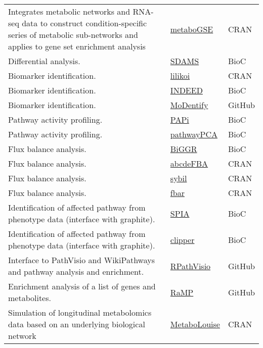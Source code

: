\documentclass[]{article}
\begin{document}
\begin{longtable}{>{\raggedright\arraybackslash}p{30em}>{\raggedright\arraybackslash}p{10em}>{\raggedright\arraybackslash}p{3em}}
\rowcolor{gray!6}  Integrates metabolic networks and RNA-seq data to construct condition-specific series of metabolic sub-networks and applies to gene set enrichment analysis & \href{https://cran.r-project.org/package=metaboGSE}{metaboGSE} & CRAN\\
Differential analysis. & \href{https://bioconductor.org/packages/release/bioc/html/SDAMS.html}{SDAMS} & BioC\\
\rowcolor{gray!6}  Biomarker identification. & \href{https://cran.r-project.org/package=lilikoi}{lilikoi} & CRAN\\
Biomarker identification. & \href{https://bioconductor.org/packages/release/bioc/html/INDEED.html}{INDEED} & BioC\\
\rowcolor{gray!6}  Biomarker identification. & \href{https://github.com/krumsieklab/MoDentify}{MoDentify} & GitHub\\
Pathway activity profiling. & \href{NA}{PAPi} & BioC\\
\rowcolor{gray!6}  Pathway activity profiling. & \href{https://www.bioconductor.org/packages/devel/bioc/html/pathwayPCA.html}{pathwayPCA} & BioC\\
Flux balance analysis. & \href{https://bioconductor.org/packages/release/bioc/html/BiGGR.html}{BiGGR} & BioC\\
\rowcolor{gray!6}  Flux balance analysis. & \href{https://cran.r-project.org/package=abcdeFBA}{abcdeFBA} & CRAN\\
Flux balance analysis. & \href{https://cran.r-project.org/package=sybil}{sybil} & CRAN\\
\rowcolor{gray!6}  Flux balance analysis. & \href{https://cran.r-project.org/package=fbar}{fbar} & CRAN\\
Identification of affected pathway from phenotype data (interface with graphite). & \href{https://www.bioconductor.org/packages/release/bioc/html/SPIA.html}{SPIA} & BioC\\
\rowcolor{gray!6}  Identification of affected pathway from phenotype data (interface with graphite). & \href{https://www.bioconductor.org/packages/release/bioc/html/clipper.html}{clipper} & BioC\\
Interface to PathVisio and WikiPathways and pathway analysis and enrichment. & \href{https://github.com/PathVisio/RpathVisio}{RPathVisio} & GitHub\\
\rowcolor{gray!6}  Enrichment analysis of a list of genes and metabolites. & \href{https://github.com/Mathelab/RaMP-DB}{RaMP} & GitHub\\
Simulation of longitudinal metabolomics data based on an underlying biological network & \href{https://cran.r-project.org/package=MetaboLouise}{MetaboLouise} & CRAN\\

\end{longtable}
\end{document}
